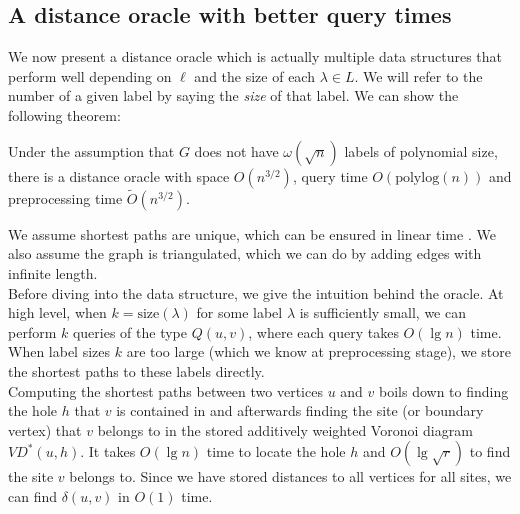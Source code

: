 \subsection{A distance oracle with better query times}\label{oracle2}
We now present a distance oracle which is actually multiple data structures that perform
well depending on $\ell$ and the size of each $\lambda\in L$. We will refer to the
number of a given label by saying the \textit{size} of that label. We can show the following theorem:
\begin{thm}\label{thm2}
  Under the assumption that $G$ does not have $\omega(\sqrt{n})$ labels of polynomial
  size, there is a distance oracle with space $O(n^{3/2})$, query time $O(\text{polylog}(n))$ and
  preprocessing time $\tilde{O}(n^{3/2})$.
\end{thm}
We assume shortest paths are unique, which can be ensured
in linear time \cite{motwani2010randomized}\cite{mulmuley1987matching}. We also assume
the graph is triangulated, which we can do by adding edges with infinite length. \\
Before diving into the data structure, we give the intuition behind the oracle. At high
level, when $k=\text{size}(\lambda)$ for some label $\lambda$ is sufficiently small, we
can perform $k$ queries of the type $Q(u,v)$, where each query takes $O(\lg n)$ time.
When label sizes $k$ are too large (which we know at preprocessing stage), we store the
shortest paths to these labels directly. \\
Computing the shortest paths between two vertices $u$ and $v$ boils down to finding the
hole $h$ that $v$ is contained in and afterwards finding the site (or boundary vertex) that $v$ belongs to in the stored additively weighted Voronoi
diagram $VD^*(u,h)$. It takes $O(\lg n)$ time to locate the hole $h$ and $O(\lg
\sqrt{r})$ to find the site $v$ belongs to. Since we have stored distances to all
vertices for all sites, we can find $\delta(u,v)$ in $O(1)$ time.

